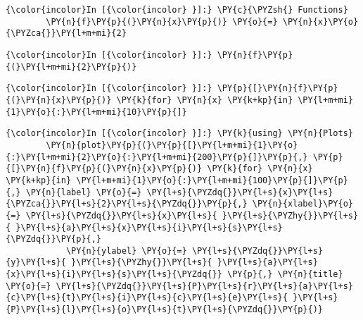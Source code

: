     \begin{Verbatim}[commandchars=\\\{\}]
{\color{incolor}In [{\color{incolor} }]:} \PY{c}{\PYZsh{} Functions}
        \PY{n}{f}\PY{p}{(}\PY{n}{x}\PY{p}{)} \PY{o}{=} \PY{n}{x}\PY{o}{\PYZca{}}\PY{l+m+mi}{2}
\end{Verbatim}


    \begin{Verbatim}[commandchars=\\\{\}]
{\color{incolor}In [{\color{incolor} }]:} \PY{n}{f}\PY{p}{(}\PY{l+m+mi}{2}\PY{p}{)}
\end{Verbatim}


    \begin{Verbatim}[commandchars=\\\{\}]
{\color{incolor}In [{\color{incolor} }]:} \PY{p}{[}\PY{n}{f}\PY{p}{(}\PY{n}{x}\PY{p}{)} \PY{k}{for} \PY{n}{x} \PY{k+kp}{in} \PY{l+m+mi}{1}\PY{o}{:}\PY{l+m+mi}{10}\PY{p}{]}
\end{Verbatim}


    \begin{Verbatim}[commandchars=\\\{\}]
{\color{incolor}In [{\color{incolor} }]:} \PY{k}{using} \PY{n}{Plots}
        \PY{n}{plot}\PY{p}{(}\PY{p}{[}\PY{l+m+mi}{1}\PY{o}{:}\PY{l+m+mi}{2}\PY{o}{:}\PY{l+m+mi}{200}\PY{p}{]}\PY{p}{,} \PY{p}{[}\PY{n}{f}\PY{p}{(}\PY{n}{x}\PY{p}{)} \PY{k}{for} \PY{n}{x} \PY{k+kp}{in} \PY{l+m+mi}{1}\PY{o}{:}\PY{l+m+mi}{100}\PY{p}{]}\PY{p}{,} \PY{n}{label} \PY{o}{=} \PY{l+s}{\PYZdq{}}\PY{l+s}{x}\PY{l+s}{\PYZca{}}\PY{l+s}{2}\PY{l+s}{\PYZdq{}}\PY{p}{,} \PY{n}{xlabel}\PY{o}{=} \PY{l+s}{\PYZdq{}}\PY{l+s}{x}\PY{l+s}{ }\PY{l+s}{\PYZhy{}}\PY{l+s}{ }\PY{l+s}{a}\PY{l+s}{x}\PY{l+s}{i}\PY{l+s}{s}\PY{l+s}{\PYZdq{}}\PY{p}{,}
            \PY{n}{ylabel} \PY{o}{=} \PY{l+s}{\PYZdq{}}\PY{l+s}{y}\PY{l+s}{ }\PY{l+s}{\PYZhy{}}\PY{l+s}{ }\PY{l+s}{a}\PY{l+s}{x}\PY{l+s}{i}\PY{l+s}{s}\PY{l+s}{\PYZdq{}} \PY{p}{,} \PY{n}{title} \PY{o}{=} \PY{l+s}{\PYZdq{}}\PY{l+s}{P}\PY{l+s}{r}\PY{l+s}{a}\PY{l+s}{c}\PY{l+s}{t}\PY{l+s}{i}\PY{l+s}{c}\PY{l+s}{e}\PY{l+s}{ }\PY{l+s}{P}\PY{l+s}{l}\PY{l+s}{o}\PY{l+s}{t}\PY{l+s}{\PYZdq{}}\PY{p}{)}
\end{Verbatim}

